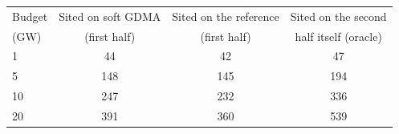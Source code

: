 \begin{tabular}{@{}lccc@{}}
\toprule
Budget & Sited on soft GDMA & Sited on the reference & Sited on the second \\
(GW) & (first half) & (first half) & half itself (oracle) \\
\midrule
1 & 44 & 42 & 47 \\
5 & 148 & 145 & 194 \\
10 & 247 & 232 & 336 \\
20 & 391 & 360 & 539 \\
\bottomrule
\end{tabular}